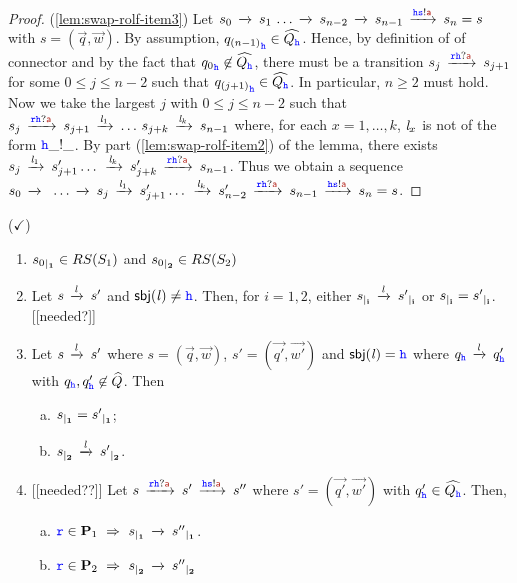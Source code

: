 \begin{proof}
(\ref{lem:swap-rolf-item3})
Let $s_0\lts{}  s_1\,\ldots \lts{} s_{n-2}  \lts{} s_{n-1}\lts{\HH\tts!\msg[a]}s_n=s$ with $s = (\vec{q},\vec{w})$.
By assumption, ${q_{(n-1)}}_{{\mathtt{\color{blue}{ {h}}}}}\in\widehat{Q_{{\mathtt{\color{blue}{ {h}}}}}}$.
Hence, by definition of of connector
 and by the fact that ${q_0}_{{\mathtt{\color{blue}{ {h}}}}}\not\in\widehat{Q_{{\mathtt{\color{blue}{ {h}}}}}}$,
 there must be a transition $s_j \lts{\ttr\HH?\msg[a]}s_{j+1}$ for
 some $0\leq j \leq n-2$ such that ${q_{(j+1)}}_{\mathtt{\color{blue}{ {h}}}}\in\widehat{Q_{\mathtt{\color{blue}{ {h}}}}}$. 
In particular, $n \geq 2$ must hold.
Now we take the largest $j$ with $0\leq j \leq n-2$ such that
 $s_j  \lts{\ttr\HH?\msg[a]} s_{j+1}\lts{\elle_1}\ldots\, s_{j+k}\lts{\elle_{k}}s_{n-1}$
 where, for each $x = 1,\ldots,k$,  $\mathit{l}_x$ is not of the form ${\mathtt{\color{blue}{ {h}}}}\_!\_$.
By part (\ref{lem:swap-rolf-item2}) of the lemma, there exists
 $s_j  \lts{\elle_1}s'_{j+1} \ldots\,  \lts{\elle_k} s'_{j+k} \lts{\ttr\HH?\msg[a]} s_{n-1}$. Thus we obtain a sequence
$s_0\lts{}\,\,\ldots \lts{}s_j  \lts{\elle_1}s'_{j+1} \ldots\,  \lts{\elle_k} s'_{n-2}\lts{\ttr\HH?\msg[a]}s_{n-1}\lts{\HH\tts!\msg[a]}s_n=s$.
\end{proof}



\begin{lemma} ($\checkmark$) \hfill
\label{lem:indrestrict}  
\begin{enumerate}[1)]
\item
\label{lem:indrestrict-a}
${s_0}_{\mid_{\mathbf{1}}}\in RS(S_1)$ and  ${s_0}_{\mid_{\mathbf{2}}}\in RS(S_2)$
\item
\label{lem:indrestrict-b}
Let $s\,\xrightarrow{\mathit{l}}_{{}}\,s'$ and $\mathsf{sbj}(\mathit{l})\neq{ \ensuremath{\mathtt{\color{blue}{ {h}}}} }$.
Then, for $i=1,2$,  either ${s}_{\mid_{\mathbf{i}}}\,\xrightarrow{\mathit{l}}_{{}}\,{s'}_{\mid_{\mathbf{i}}}$ or  ${s}_{\mid_{\mathbf{i}}}={s'}_{\mid_{\mathbf{i}}}$.
[[needed?]]
\item
\label{lem:indrestrict-c}
Let $s\,\xrightarrow{\mathit{l}}_{{}}\,s'$ where $s= (\vec{q},\vec{w})$, $s'= (\vec{q'},\vec{w'})$
and $\mathsf{sbj}(\mathit{l})={\mathtt{\color{blue}{ {h}}}}$ %
where %
$q_{\mathtt{\color{blue}{ {h}}}}\,\xrightarrow{\mathit{l}}_{{}}\,q'_{\mathtt{\color{blue}{ {h}}}}$ with $q_{\mathtt{\color{blue}{ {h}}}},q'_{\mathtt{\color{blue}{ {h}}}}\not\in\widehat{Q}$. Then
\begin{enumerate}[a)]
\item
\label{lem:indrestrict-c1}
${s}_{\mid_{\mathbf{1}}} = {s'}_{\mid_{\mathbf{1}}}$;
\item
\label{lem:indrestrict-c2}
${s}_{\mid_{\mathbf{2}}}\,\xrightarrow{\mathit{l}}_{{}}\,{s'}_{\mid_{\mathbf{2}}}$.
\end{enumerate}
\item
\label{lem:indrestrict-d} [[needed??]]
Let $s\lts{\ttr\HH?\msg[a]} s'\lts{\HH\tts!\msg[a]} s''$ where $s'= (\vec{q'},\vec{w'})$ with $q'_{\mathtt{\color{blue}{ {h}}}}\in \widehat{Q_{\mathtt{\color{blue}{ {h}}}}}$.
Then, 
\begin{enumerate}[a)]
\item
${\mathtt{\color{blue}{ {r}}}}\in\mathbf{P}_1 ~\Rightarrow~ {s}_{\mid_{\mathbf{1}}}\,\xrightarrow{}_{{}}\,{s''}_{\mid_{\mathbf{1}}}$.
\item
${\mathtt{\color{blue}{ {r}}}}\in\mathbf{P}_2 ~\Rightarrow~ {s}_{\mid_{\mathbf{2}}}\,\xrightarrow{}_{{}}\,{s''}_{\mid_{\mathbf{2}}}$
\end{enumerate}
\end{enumerate}
\end{lemma}

